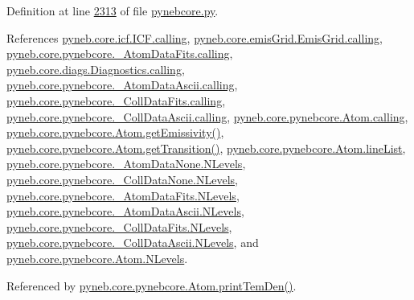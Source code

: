 Definition at line \hyperlink{pynebcore_8py_source_l02313}{2313} of file \hyperlink{pynebcore_8py_source}{pynebcore.\+py}.



References \hyperlink{icf_8py_source_l00016}{pyneb.\+core.\+icf.\+I\+C\+F.\+calling}, \hyperlink{emis_grid_8py_source_l00041}{pyneb.\+core.\+emis\+Grid.\+Emis\+Grid.\+calling}, \hyperlink{pynebcore_8py_source_l00090}{pyneb.\+core.\+pynebcore.\+\_\+\+Atom\+Data\+Fits.\+calling}, \hyperlink{diags_8py_source_l00169}{pyneb.\+core.\+diags.\+Diagnostics.\+calling}, \hyperlink{pynebcore_8py_source_l00311}{pyneb.\+core.\+pynebcore.\+\_\+\+Atom\+Data\+Ascii.\+calling}, \hyperlink{pynebcore_8py_source_l00568}{pyneb.\+core.\+pynebcore.\+\_\+\+Coll\+Data\+Fits.\+calling}, \hyperlink{pynebcore_8py_source_l00918}{pyneb.\+core.\+pynebcore.\+\_\+\+Coll\+Data\+Ascii.\+calling}, \hyperlink{pynebcore_8py_source_l01175}{pyneb.\+core.\+pynebcore.\+Atom.\+calling}, \hyperlink{pynebcore_8py_source_l01716}{pyneb.\+core.\+pynebcore.\+Atom.\+get\+Emissivity()}, \hyperlink{pynebcore_8py_source_l01406}{pyneb.\+core.\+pynebcore.\+Atom.\+get\+Transition()}, \hyperlink{pynebcore_8py_source_l01218}{pyneb.\+core.\+pynebcore.\+Atom.\+line\+List}, \hyperlink{pynebcore_8py_source_l00062}{pyneb.\+core.\+pynebcore.\+\_\+\+Atom\+Data\+None.\+N\+Levels}, \hyperlink{pynebcore_8py_source_l00075}{pyneb.\+core.\+pynebcore.\+\_\+\+Coll\+Data\+None.\+N\+Levels}, \hyperlink{pynebcore_8py_source_l00155}{pyneb.\+core.\+pynebcore.\+\_\+\+Atom\+Data\+Fits.\+N\+Levels}, \hyperlink{pynebcore_8py_source_l00404}{pyneb.\+core.\+pynebcore.\+\_\+\+Atom\+Data\+Ascii.\+N\+Levels}, \hyperlink{pynebcore_8py_source_l00637}{pyneb.\+core.\+pynebcore.\+\_\+\+Coll\+Data\+Fits.\+N\+Levels}, \hyperlink{pynebcore_8py_source_l00984}{pyneb.\+core.\+pynebcore.\+\_\+\+Coll\+Data\+Ascii.\+N\+Levels}, and \hyperlink{pynebcore_8py_source_l01260}{pyneb.\+core.\+pynebcore.\+Atom.\+N\+Levels}.



Referenced by \hyperlink{pynebcore_8py_source_l02253}{pyneb.\+core.\+pynebcore.\+Atom.\+print\+Tem\+Den()}.


